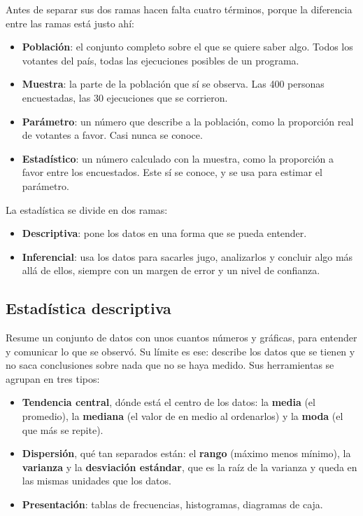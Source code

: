 \documentclass[11pt,letterpaper]{article}
\begin{document}
Antes de separar sus dos ramas hacen falta cuatro términos, porque la
diferencia entre las ramas está justo ahí:

\begin{itemize}[itemsep=0.3em]
    \item \textbf{Población}: el conjunto completo sobre el que se
          quiere saber algo. Todos los votantes del país, todas las
          ejecuciones posibles de un programa.
    \item \textbf{Muestra}: la parte de la población que sí se
          observa. Las 400 personas encuestadas, las 30 ejecuciones
          que se corrieron.
    \item \textbf{Parámetro}: un número que describe a la población,
          como la proporción real de votantes a favor. Casi nunca se
          conoce.
    \item \textbf{Estadístico}: un número calculado con la muestra,
          como la proporción a favor entre los encuestados. Este sí se
          conoce, y se usa para estimar el parámetro.
\end{itemize}

La estadística se divide en dos ramas:

\begin{itemize}[itemsep=0.3em]
    \item \textbf{Descriptiva}: pone los datos en una forma que se
          pueda entender.
    \item \textbf{Inferencial}: usa los datos para sacarles jugo,
          analizarlos y concluir algo más allá de ellos, siempre con un
          margen de error y un nivel de confianza.
\end{itemize}


\subsection*{Estadística descriptiva}

Resume un conjunto de datos con unos cuantos números y gráficas, para
entender y comunicar lo que se observó. Su límite es ese: describe los
datos que se tienen y no saca conclusiones sobre nada que no se haya
medido. Sus herramientas se agrupan en tres tipos:

\begin{itemize}[itemsep=0.3em]
    \item \textbf{Tendencia central}, dónde está el centro de los
          datos: la \textbf{media} (el promedio), la \textbf{mediana}
          (el valor de en medio al ordenarlos) y la \textbf{moda} (el
          que más se repite).
    \item \textbf{Dispersión}, qué tan separados están: el
          \textbf{rango} (máximo menos mínimo), la \textbf{varianza} y
          la \textbf{desviación estándar}, que es la raíz de la
          varianza y queda en las mismas unidades que los datos.
    \item \textbf{Presentación}: tablas de frecuencias, histogramas,
          diagramas de caja.
\end{itemize}
\end{document}
